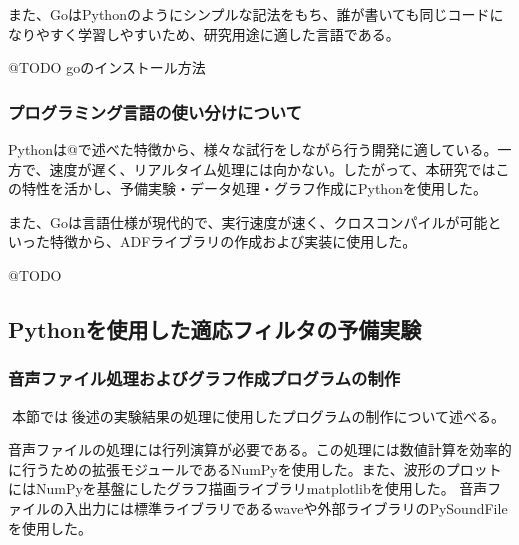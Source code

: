 また、GoはPythonのようにシンプルな記法をもち、誰が書いても同じコードになりやすく学習しやすいため、研究用途に適した言語である。

@TODO goのインストール方法

\hypertarget{ux30d7ux30edux30b0ux30e9ux30dfux30f3ux30b0ux8a00ux8a9eux306eux4f7fux3044ux5206ux3051ux306bux3064ux3044ux3066}{%
\subsubsection{プログラミング言語の使い分けについて}\label{ux30d7ux30edux30b0ux30e9ux30dfux30f3ux30b0ux8a00ux8a9eux306eux4f7fux3044ux5206ux3051ux306bux3064ux3044ux3066}}

Pythonは@で述べた特徴から、様々な試行をしながら行う開発に適している。一方で、速度が遅く、リアルタイム処理には向かない。したがって、本研究ではこの特性を活かし、予備実験・データ処理・グラフ作成にPythonを使用した。

また、Goは言語仕様が現代的で、実行速度が速く、クロスコンパイルが可能といった特徴から、ADFライブラリの作成および実装に使用した。

@TODO

\hypertarget{pythonux3092ux4f7fux7528ux3057ux305fux9069ux5fdcux30d5ux30a3ux30ebux30bfux306eux4e88ux5099ux5b9fux9a13}{%
\subsection{Pythonを使用した適応フィルタの予備実験}\label{pythonux3092ux4f7fux7528ux3057ux305fux9069ux5fdcux30d5ux30a3ux30ebux30bfux306eux4e88ux5099ux5b9fux9a13}}

\hypertarget{ux97f3ux58f0ux30d5ux30a1ux30a4ux30ebux51e6ux7406ux304aux3088ux3073ux30b0ux30e9ux30d5ux4f5cux6210ux30d7ux30edux30b0ux30e9ux30e0ux306eux5236ux4f5c}{%
\subsubsection{音声ファイル処理およびグラフ作成プログラムの制作}\label{ux97f3ux58f0ux30d5ux30a1ux30a4ux30ebux51e6ux7406ux304aux3088ux3073ux30b0ux30e9ux30d5ux4f5cux6210ux30d7ux30edux30b0ux30e9ux30e0ux306eux5236ux4f5c}}

本節では後述の実験結果の処理に使用したプログラムの制作について述べる。

音声ファイルの処理には行列演算が必要である。この処理には数値計算を効率的に行うための拡張モジュールであるNumPyを使用した。また、波形のプロットにはNumPyを基盤にしたグラフ描画ライブラリmatplotlibを使用した。
音声ファイルの入出力には標準ライブラリであるwaveや外部ライブラリのPySoundFileを使用した。

